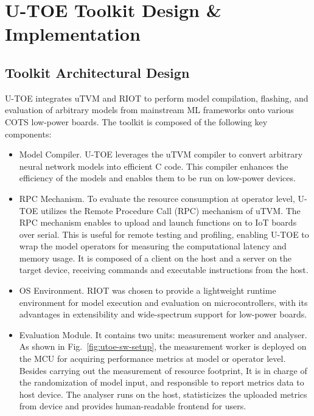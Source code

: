 \section{U-TOE Toolkit Design \& Implementation}

\subsection{Toolkit Architectural Design}
U-TOE integrates uTVM and RIOT to perform model compilation, flashing, and evaluation of arbitrary models from mainstream ML frameworks onto various COTS low-power boards. The toolkit is composed of the following key components:
\begin{itemize}
    \item Model Compiler. U-TOE leverages the uTVM compiler to convert arbitrary neural network models into efficient C code. This compiler enhances the efficiency of the models and enables them to be run on low-power devices.

    \item RPC Mechanism. To evaluate the resource consumption at operator level, U-TOE utilizes the Remote Procedure Call (RPC) mechanism of uTVM. The RPC mechanism enables to upload and launch functions on to IoT boards over serial. This is useful for remote testing and profiling, enabling U-TOE to wrap the model operators for measuring the computational latency and memory usage. It is composed of a client on the host and a server on the target device, receiving commands and executable instructions from the host.

    \item OS Environment. RIOT was chosen to provide a lightweight runtime environment for model execution and evaluation on microcontrollers, with its advantages in extensibility and wide-spectrum support for low-power boards.

    \item Evaluation Module. It contains two units: measurement worker and analyser. As shown in Fig.~\ref{fig:utoe-sw-setup}, the measurement worker is deployed on the MCU for acquiring performance metrics at model or operator level. Besides carrying out the measurement of resource footprint, It is in charge of the randomization of model input, and responsible to report metrics data to host device. The analyser runs on the host, statisticizes the uploaded metrics from device and provides human-readable frontend for users. 
\end{itemize}

